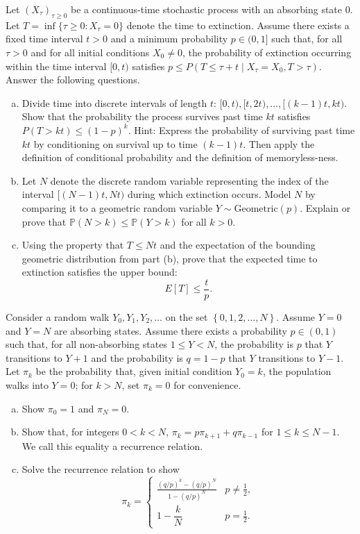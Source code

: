 \begin{exercises}
Let $(X_\tau)_{\tau \ge 0}$ be a continuous-time stochastic process with an absorbing state $0$. Let $T = \inf \{\tau \ge 0 : X_\tau = 0\}$ denote the time to extinction. Assume there exists a fixed time interval $t > 0$ and a minimum probability $p \in (0, 1]$ such that, for all $\tau > 0$ and for all initial conditions $X_0 \neq 0$, the probability of extinction occurring within the time interval $[0, t)$ satisfies $p \leq P(T \le \tau + t \mid X_\tau = X_0, T > \tau)$. Answer the following questions.
\begin{enumerate}[(a)]
    \item Divide time into discrete intervals of length $t$: $[0, t), [t, 2t), \dots, [(k-1)t, kt)$. Show that the probability the process survives past time $kt$ satisfies $P(T > kt) \leq (1-p)^k$. Hint: Express the probability of surviving past time $kt$ by conditioning on survival up to time $(k-1)t$. Then apply the definition of conditional probability and the definition of memoryless-ness.
    
    \item Let $N$ denote the discrete random variable representing the index of the interval $[(N-1)t, Nt)$ during which extinction occurs. Model $N$ by comparing it to a geometric random variable $Y \sim \text{Geometric}(p)$. Explain or prove that $\mathbb{P}\left(N>k\right)\leq \mathbb{P}\left(Y>k\right)$ for all $k > 0$.
    
    \item Using the property that $T \leq Nt$ and the expectation of the bounding geometric distribution from part (b), prove that the expected time to extinction satisfies the upper bound:
    \[
    E[T] \le \frac{t}{p}.
    \]
\end{enumerate}


\item \label{ex:hw_gamblers_ruin}
Consider a random walk $Y_0, Y_1, Y_2, \ldots$ on the set $\left\{0, 1, 2, \ldots, N\right\}$. Assume $Y=0$ and $Y=N$ are absorbing states. Assume there exists a probability $p \in (0,1)$ such that, for all non-absorbing states $1 \leq Y < N$, the probability is $p$ that $Y$ transitions to $Y+1$ and the probability is $q = 1-p$ that $Y$ transitions to $Y-1$. Let $\pi_k$ be the probability that, given initial condition $Y_0 = k$, the population walks into $Y=0$; for $k > N$, set $\pi_k = 0$ for convenience.
\begin{enumerate}[(a)]
    \item Show $\pi_0 = 1$ and $\pi_N = 0$.
    \item Show that, for integers $0 < k < N$, $\pi_k = p\pi_{k+1} + q\pi_{k-1}$ for $1 \leq k \leq N-1$. We call this equality a recurrence relation.
    \item Solve the recurrence relation to show
\[
\pi_k = \begin{cases}
\displaystyle\frac{(q/p)^k - (q/p)^N}{1-(q/p)^N} & p \neq \tfrac{1}{2}, \\[10pt]
1 - \dfrac{k}{N} & p = \tfrac{1}{2}.
\end{cases}
\]


\end{enumerate}
\end{exercises}
